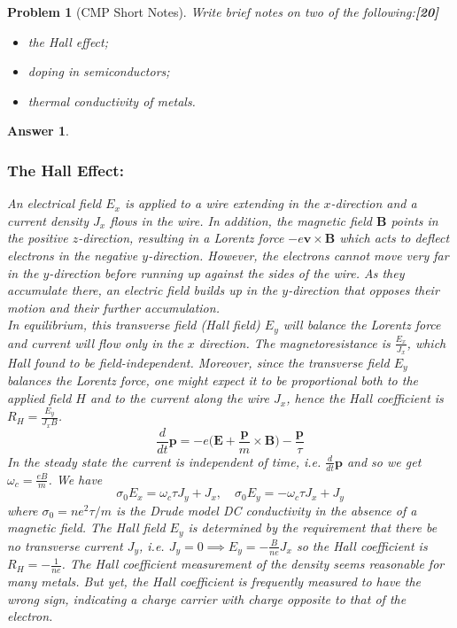 \documentclass[a4paper]{article}
\newtheorem{ans}{Answer}[subsection]
\theoremstyle{new}
\newtheorem{qns}{Problem}[subsection]
\begin{document}
\newpage
\begin{qns}[CMP Short Notes]
Write brief notes on two of the following:\hfill\textbf{[20]}
\begin{itemize}
    \item the Hall effect;
    \item doping in semiconductors;
    \item thermal conductivity of metals.
\end{itemize}
\end{qns}
\begin{ans}\leavevmode
\subsubsection*{The Hall Effect:}
An electrical field $E_x$ is applied to a wire extending in the $x$-direction and a current density $J_x$ flows in the wire. In addition, the magnetic field $\mathbf{B}$ points in the positive $z$-direction, resulting in a Lorentz force $-e\mathbf{v}\times\mathbf{B}$ which  acts to deflect electrons in the negative $y$-direction. However, the electrons cannot move very far in the $y$-direction before running up against the sides of the wire. As they accumulate there, an electric field builds up in the $y$-direction that opposes their motion and their further accumulation.\\[5pt]
In equilibrium, this transverse field (Hall field) $E_y$ will balance the Lorentz force and current will flow only in the $x$ direction. The magnetoresistance is $\frac{E_x}{J_x}$, which Hall found to be field-independent. Moreover, since the transverse field $E_y$ balances the Lorentz force, one might expect it to be proportional both to the applied field $H$ and to the current along the wire $J_x$, hence the Hall coefficient is $R_H=\frac{E_y}{J_xB}$.
$$\frac{d}{dt}\mathbf{p}=-e\bigg(\mathbf{E}+\frac{\mathbf{p}}{m}\times\mathbf{B}\bigg)-\frac{\mathbf{p}}{\tau}$$
In the steady state the current is independent of time, i.e. $\frac{d}{dt}\mathbf{p}$ and so we get $\omega_c=\frac{eB}{m}$. We have
$$\sigma_0E_x=\omega_c\tau J_y+J_x,\quad \sigma_0E_y=-\omega_c\tau J_x+J_y$$
where $\sigma_0=ne^2\tau/m$ is the Drude model DC conductivity in the absence of a magnetic field. The Hall field $E_y$ is determined by the requirement that there be no transverse current $J_y$, i.e. $J_y=0\implies E_y=-\frac{B}{ne}J_x$ so the Hall coefficient is $R_H=-\frac{1}{ne}$. The Hall coefficient measurement of the density seems reasonable for many metals. But yet, the Hall coefficient is frequently measured to have the wrong sign, indicating a charge carrier with charge opposite to that of the electron.

\end{ans}
\end{document}
